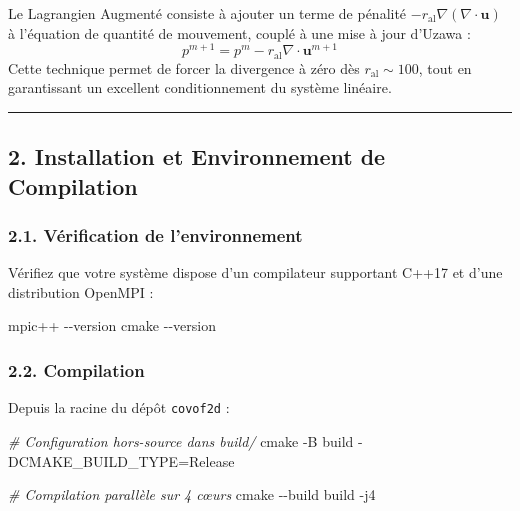 \documentclass[
  french,
]{article}
\newenvironment{Shaded}{}{}
\newcommand{\AttributeTok}[1]{\textcolor[rgb]{0.49,0.56,0.16}{#1}}
\newcommand{\CommentTok}[1]{\textcolor[rgb]{0.38,0.63,0.69}{\textit{#1}}}
\newcommand{\ExtensionTok}[1]{#1}
\newcommand{\FunctionTok}[1]{\textcolor[rgb]{0.02,0.16,0.49}{#1}}
\newcommand{\NormalTok}[1]{#1}
\newcommand{\OperatorTok}[1]{\textcolor[rgb]{0.40,0.40,0.40}{#1}}
\begin{document}
Le Lagrangien Augmenté consiste à ajouter un terme de pénalité
\(-r_{\text{al}} \nabla (\nabla \cdot \mathbf{u})\) à l'équation de
quantité de mouvement, couplé à une mise à jour d'Uzawa :
\[p^{m+1} = p^m - r_{\text{al}} \nabla \cdot \mathbf{u}^{m+1}\] Cette
technique permet de forcer la divergence à zéro dès
\(r_{\text{al}} \sim 100\), tout en garantissant un excellent
conditionnement du système linéaire.

\begin{center}\rule{0.5\linewidth}{0.5pt}\end{center}

\subsection{2. Installation et Environnement de
Compilation}\label{installation-et-environnement-de-compilation}

\subsubsection{2.1. Vérification de
l'environnement}\label{vuxe9rification-de-lenvironnement}

Vérifiez que votre système dispose d'un compilateur supportant C++17 et
d'une distribution OpenMPI :

\begin{Shaded}
\begin{Highlighting}[]
\ExtensionTok{mpic++} \AttributeTok{{-}{-}version}
\FunctionTok{cmake} \AttributeTok{{-}{-}version}
\end{Highlighting}
\end{Shaded}

\subsubsection{2.2. Compilation}\label{compilation}

Depuis la racine du dépôt \texttt{covof2d} :

\begin{Shaded}
\begin{Highlighting}[]
\CommentTok{\# Configuration hors{-}source dans build/}
\FunctionTok{cmake} \AttributeTok{{-}B}\NormalTok{ build }\AttributeTok{{-}DCMAKE\_BUILD\_TYPE}\OperatorTok{=}\NormalTok{Release}

\CommentTok{\# Compilation parallèle sur 4 cœurs}
\FunctionTok{cmake} \AttributeTok{{-}{-}build}\NormalTok{ build }\AttributeTok{{-}j4}
\end{Highlighting}
\end{Shaded}
\end{document}
